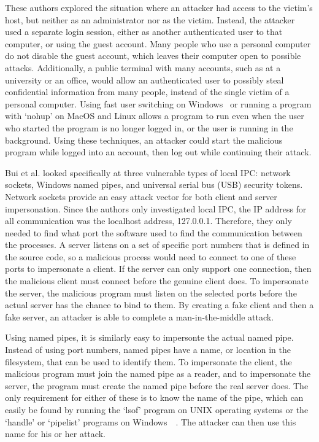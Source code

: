 These authors explored the situation where an attacker had access to the victim's host, but neither as an administrator nor as the victim.  Instead, the attacker used a separate login session, either as another authenticated user to that computer, or using the guest account.  Many people who use a personal computer do not disable the guest account, which leaves their computer open to possible attacks.  Additionally, a public terminal with many accounts, such as at a university or an office, would allow an authenticated user to possibly steal confidential information from many people, instead of the single victim of a personal computer.  Using fast user switching on Windows~\cite{microsoft_developers_network_2018} or running a program with `nohup' on MacOS and Linux allows a program to run even when the user who started the program is no longer logged in, or the user is running in the background.  Using these techniques, an attacker could start the malicious program while logged into an account, then log out while continuing their attack.

Bui et al. looked specifically at three vulnerable types of local IPC: network sockets, Windows named pipes, and universal serial bus (USB) security tokens.  Network sockets provide an easy attack vector for both client and server impersonation.  Since the authors only investigated local IPC, the IP address for all communication was the localhost address, 127.0.0.1.  Therefore, they only needed to find what port the software used to find the communication between the processes.  A server listens on a set of specific port numbers that is defined in the source code, so a malicious process would need to connect to one of these ports to impersonate a client.  If the server can only support one connection, then the malicious client must connect before the genuine client does.  To impersonate the server, the malicious program must listen on the selected ports before the actual server has the chance to bind to them.  By creating a fake client and then a fake server, an attacker is able to complete a man-in-the-middle attack.

Using named pipes, it is similarly easy to impersonte the actual named pipe.  Instead of using port numbers, named pipes have a name, or location in the filesystem, that can be used to identify them.  To impersonate the client, the malicious program must join the named pipe as a reader, and to impersonate the server, the program must create the named pipe before the real server does.  The only requirement for either of these is to know the name of the pipe, which can easily be found by running the `lsof' program on UNIX operating systems or the `handle' or `pipelist' programs on Windows~\cite{russinovich_2018}~\cite{markruss_sharkey_2016}.  The attacker can then use this name for his or her attack.


